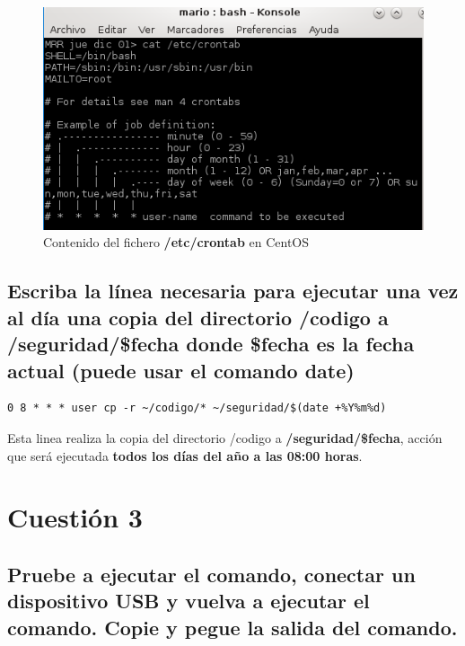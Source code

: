 \begin{figure}[H] %
	\centering
	\includegraphics[scale=0.8]{figuras/figura3.png} 
	\caption{Contenido del fichero \textbf{/etc/crontab} en CentOS} 
	\label{fig:figura3}
\end{figure}

\subsection{Escriba la línea necesaria para ejecutar una vez al día una copia del
	directorio \AC/codigo a \AC{}/seguridad/\$fecha donde \$fecha es la fecha actual
	(puede usar el comando date)}

\begin{lstlisting}[style=fich]
0 8 * * * user cp -r ~/codigo/* ~/seguridad/$(date +%Y%m%d)
\end{lstlisting}

Esta linea realiza la copia del directorio \AC/codigo a \textbf{\AC{}/seguridad/\$fecha}, acción que será ejecutada \textbf{todos los días del año a las 08:00 horas}.

\newpage


\section{Cuestión 3}
\subsection{Pruebe a ejecutar el comando, conectar un dispositivo USB y
	vuelva a ejecutar el comando. Copie y pegue la salida del comando.}

